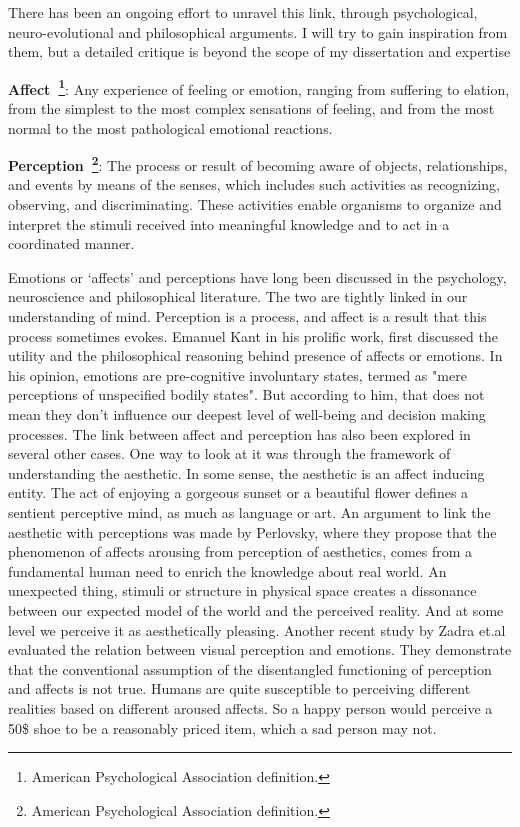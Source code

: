 There has been an ongoing effort to unravel this link, through psychological, neuro-evolutional and philosophical arguments. I will try to gain inspiration from them, but a detailed critique is beyond the scope of my dissertation and expertise\\
\begin{definition}
    \textbf{Affect~\footnote{American Psychological Association definition.}}: Any experience of feeling or emotion, ranging from suffering to elation, from the simplest to the most complex sensations of feeling, and from the most normal to the most pathological emotional reactions.\\
\end{definition}


\begin{definition}
    \textbf{Perception~\footnote{American Psychological Association definition.}}: The process or result of becoming aware of objects, relationships, and events by means of the senses, which includes such activities as recognizing, observing, and discriminating. These activities enable organisms to organize and interpret the stimuli received into meaningful knowledge and to act in a coordinated manner.
\end{definition}


Emotions or `affects' and perceptions have long been discussed in the psychology, neuroscience and philosophical literature. The two are tightly linked in our understanding of mind. Perception is a process, and affect is a result that this process sometimes evokes.  
Emanuel Kant in his prolific work, first discussed the utility and the philosophical reasoning behind presence of affects or emotions\cite{kant1987critique}. In his opinion, emotions are pre-cognitive involuntary states, termed as "mere perceptions of unspecified bodily states"\cite{borges2004can}. 
But according to him, that does not mean they don't influence our deepest level of well-being and decision making processes.
The link between affect and perception has also been explored in several other cases. One way to look at it was through the framework of understanding the aesthetic. In some sense, the aesthetic is an affect inducing entity. The act of enjoying a gorgeous sunset or a beautiful flower defines a sentient perceptive mind, as much as language or art.  
An argument to link the aesthetic with perceptions was made by Perlovsky\cite{perlovsky2014aesthetic}, where they propose that the phenomenon of affects arousing from perception of aesthetics, comes from a fundamental human need to enrich the knowledge about real world. An unexpected thing, stimuli or structure in physical space creates a dissonance between our expected model of the world and the perceived reality. And at some level we perceive it as aesthetically pleasing. Another recent study by Zadra et.al\cite{zadra2011emotion} evaluated the relation between visual perception and emotions. They demonstrate that the conventional assumption of the disentangled functioning of perception and affects is not true. Humans are quite susceptible to perceiving different realities based on different aroused affects. So a happy person would perceive a 50\$ shoe to be a reasonably priced item, which a sad person may not. 

